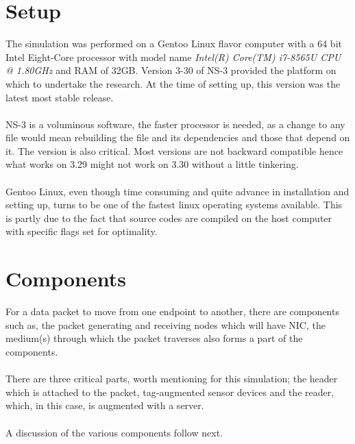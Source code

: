 \section{Setup}
The simulation was performed on a Gentoo Linux flavor computer with a 64 bit Intel
Eight-Core processor with model name \textit{Intel(R) Core(TM) i7-8565U CPU @
1.80GHz} and RAM of 32GB. Version 3-30 of NS-3 provided the platform on which to
undertake the research. At the time of setting up, this version was the latest most
stable release.\\\\
NS-3 is a voluminous software, the faster processor is needed, as a change to any
file would mean rebuilding the file and its dependencies and those that depend on it.
The version is also critical. Most versions are not backward compatible hence what
works on 3.29 might not work on 3.30 without a little tinkering.\\\\
Gentoo Linux, even though time consuming and quite advance in installation and
setting up, turns to be one of the fastest linux operating systems available. This is
partly due to the fact that source codes are compiled on the host computer with 
specific flags set for optimality.

\section{Components}
For a data packet to move from one endpoint to another, there are components such as,
the packet generating and receiving nodes which will have NIC, the medium(s) through
which the packet traverses also forms a part of the components.\\\\
There are three critical parts, worth mentioning for this simulation; the header which
is attached to the packet, tag-augmented sensor devices and the reader, which, in this
case, is augmented with a server.\\\\
A discussion of the various components follow next.
